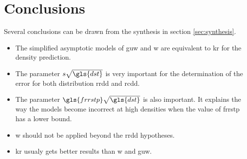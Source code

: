 \section{Conclusions}

Several conclusions can be drawn from the synthesis in section \ref{sec:synthesis}.

\begin{itemize}
\item The simplified asymptotic models of \gls{guw} and \gls{w} are equivalent to \gls{kr} for the density prediction.
\item The parameter \( s \sqrt{\gls{dst}} \) is very important for the determination of the error for both distribution \gls{rrdd} and \gls{rcdd}.
\item The parameter \( \gls{frrstp} \sqrt{\gls{dst}} \) is also important. It explains the way the models become incorrect at high densities when the value of \gls{frrstp} has a lower bound.
\item \gls{w} should not be applied beyond the \gls{rrdd} hypotheses.
\item \gls{kr} usualy gets better results than \gls{w} and \gls{guw}.
\end{itemize}
